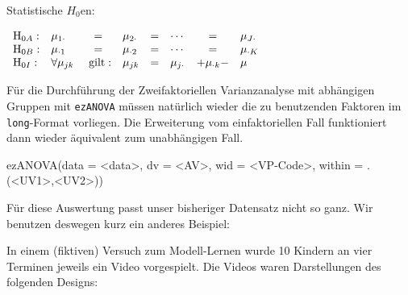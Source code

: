 \documentclass[
]{book}
\newenvironment{Shaded}{\begin{snugshade}}{\end{snugshade}}
\newcommand{\AttributeTok}[1]{\textcolor[rgb]{0.77,0.63,0.00}{#1}}
\newcommand{\FunctionTok}[1]{\textcolor[rgb]{0.00,0.00,0.00}{#1}}
\newcommand{\NormalTok}[1]{#1}
\newcommand{\SpecialCharTok}[1]{\textcolor[rgb]{0.00,0.00,0.00}{#1}}
\begin{document}
Statistische \(H_0\)en:

\(\begin{array}{l l c l c l c l} \text{H}_{0A}: & \mu_{1\cdot} & = & \mu_{2\cdot} & = & \cdots & = & \mu_{J\cdot} \\ \text{H}_{0B}: & \mu_{\cdot 1} & = & \mu_{\cdot 2} & = & \cdots & = & \mu_{\cdot K} \\ \text{H}_{0I}: & \forall {\mu}_{jk} & \text{ gilt}: &{\mu}_{jk} & = & {\mu}_{j\cdot}& + {\mu}_{\cdot k} -& \mu \end{array}\)

Für die Durchführung der Zweifaktoriellen Varianzanalyse mit abhängigen Gruppen mit \texttt{ezANOVA} müssen natürlich wieder die zu benutzenden Faktoren im \texttt{long}-Format vorliegen.
Die Erweiterung vom einfaktoriellen Fall funktioniert dann wieder äquivalent zum unabhängigen Fall.

\begin{Shaded}
\begin{Highlighting}[]
\FunctionTok{ezANOVA}\NormalTok{(}\AttributeTok{data =} \SpecialCharTok{\textless{}}\NormalTok{data}\SpecialCharTok{\textgreater{}}\NormalTok{, }
        \AttributeTok{dv =} \SpecialCharTok{\textless{}}\NormalTok{AV}\SpecialCharTok{\textgreater{}}\NormalTok{, }
        \AttributeTok{wid =} \SpecialCharTok{\textless{}}\NormalTok{VP}\SpecialCharTok{{-}}\NormalTok{Code}\SpecialCharTok{\textgreater{}}\NormalTok{,}
        \AttributeTok{within =}\NormalTok{ .(}\SpecialCharTok{\textless{}}\NormalTok{UV1}\SpecialCharTok{\textgreater{}}\NormalTok{,}\SpecialCharTok{\textless{}}\NormalTok{UV2}\SpecialCharTok{\textgreater{}}\NormalTok{))}
\end{Highlighting}
\end{Shaded}

Für diese Auswertung passt unser bisheriger Datensatz nicht so ganz.
Wir benutzen deswegen kurz ein anderes Beispiel:

In einem (fiktiven) Versuch zum Modell-Lernen wurde 10 Kindern an vier Terminen jeweils ein Video vorgespielt. Die Videos waren Darstellungen des folgenden Designs:

 
  \providecommand{\huxb}[2]{\arrayrulecolor[RGB]{#1}\global\arrayrulewidth=#2pt}
  \providecommand{\huxvb}[2]{\color[RGB]{#1}\vrule width #2pt}
  \providecommand{\huxtpad}[1]{\rule{0pt}{#1}}
  \providecommand{\huxbpad}[1]{\rule[-#1]{0pt}{#1}}
\end{document}
